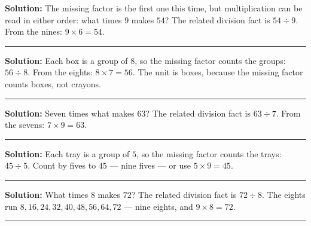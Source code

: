 \documentclass[12pt]{article}
\begin{document}
\textbf{Solution:} The missing factor is the first one this time, but multiplication can be read in
either order: what times $9$ makes $54$? The related division fact is $54 \div 9$. From the nines:
$9 \times 6 = 54$. 

\vspace{0.15cm}\noindent\rule{\linewidth}{0.2pt}


\textbf{Solution:} Each box is a group of $8$, so the missing factor counts the groups: $56 \div 8$.
From the eights: $8 \times 7 = 56$. The unit is boxes, because the missing factor counts boxes, not
crayons. 

\vspace{0.15cm}\noindent\rule{\linewidth}{0.2pt}


\textbf{Solution:} Seven times what makes $63$? The related division fact is $63 \div 7$. From the
sevens: $7 \times 9 = 63$. 

\vspace{0.15cm}\noindent\rule{\linewidth}{0.2pt}


\textbf{Solution:} Each tray is a group of $5$, so the missing factor counts the trays: $45 \div 5$.
Count by fives to $45$ --- nine fives --- or use $5 \times 9 = 45$. 

\vspace{0.15cm}\noindent\rule{\linewidth}{0.2pt}


\textbf{Solution:} What times $8$ makes $72$? The related division fact is $72 \div 8$. The eights run
$8, 16, 24, 32, 40, 48, 56, 64, 72$ --- nine eights, and $9 \times 8 = 72$. 

\vspace{0.15cm}\noindent\rule{\linewidth}{0.2pt}
\end{document}

